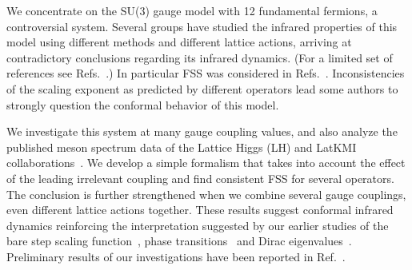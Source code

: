 \documentclass[aps,prl,twocolumn,]{revtex4-1}  %
\newcommand{\refcite}[1]{Ref.~\cite{#1}}
\begin{document}
We concentrate on the SU(3) gauge model with 12 fundamental fermions,
a controversial system.
Several groups have studied the infrared properties of this model using different methods and different lattice actions, arriving at contradictory conclusions regarding its infrared dynamics.
(For a limited set of references see Refs.~\cite{Appelquist:2009ty, Deuzeman:2009mh,  Fodor:2011tu, Appelquist:2011dp,DeGrand:2011cu, Hasenfratz:2011xn,Cheng:2011ic, Cheng:2013eu, Fodor:2012uw, Fodor:2012et,  Aoki:2012eq, Aoki:2013pca, Itou:2012qn, Lin:2012iw, Jin:2012dw}.) In particular FSS was considered in Refs.~\cite{Fodor:2011tu,Appelquist:2011dp,DeGrand:2011cu,Fodor:2012et,Aoki:2012eq}. Inconsistencies of the scaling exponent as predicted by different operators lead some authors to strongly question the conformal  behavior of this model.

We investigate this system at many gauge coupling values, and  also analyze the published meson spectrum data of the Lattice Higgs (LH) and LatKMI collaborations~\cite{Fodor:2011tu,Aoki:2012eq}. We develop a simple  formalism that  takes into account the effect of the leading irrelevant coupling and find consistent FSS  for several operators. The conclusion is further strengthened  when we combine several gauge couplings,  even  different lattice actions  together. These results suggest conformal infrared dynamics reinforcing the interpretation suggested by our earlier studies of the bare step scaling function~\cite{Hasenfratz:2011xn}, phase transitions~\cite{Hasenfratz:2013uha} and Dirac eigenvalues~\cite{Cheng:2013eu}.
 Preliminary results of our investigations have been reported in \refcite{Hasenfratz:2013eka}.
\end{document}
